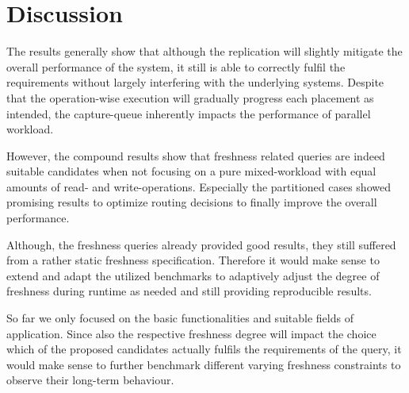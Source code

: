 




\section{Discussion}
\label{sec:discussion}

The results generally show that although the replication will slightly mitigate the overall performance of the system, it still is able to correctly fulfil the 
requirements without largely interfering with the underlying systems. 
Despite that the operation-wise execution will gradually progress each placement as intended, the capture-queue inherently impacts the performance of parallel workload.

However, the compound results show that freshness related queries are indeed suitable candidates when not focusing on a pure mixed-workload with equal amounts of 
read- and write-operations.
Especially the partitioned cases showed promising results to optimize routing decisions to finally improve the overall performance.


Although, the freshness queries already provided good results, they still suffered from a rather static freshness specification. 
Therefore it would make sense to extend and adapt the utilized benchmarks to adaptively adjust the degree of freshness during runtime
as needed and still providing reproducible results.

So far we only focused on the basic functionalities and suitable fields of application.
Since also the respective freshness degree will impact the choice which of the proposed candidates actually fulfils the requirements of the query,
it would make sense to further benchmark different varying freshness constraints to observe their long-term behaviour. 






